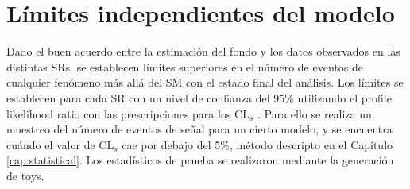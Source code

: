 \begin{table}[ht!]
\begin{tabular}{lccc}
      \hline
      \hline
    \end{tabular}
\label{tab:syst_rel_impact}
\end{table}




\section{Límites independientes del modelo}


Dado el buen acuerdo entre la estimación del fondo y los datos observados en las distintas SRs, se establecen límites superiores en el número de eventos de cualquier fenómeno más allá del SM con el estado final del análisis. Los límites se establecen para cada SR con un nivel de confianza del 95\% utilizando el profile likelihood ratio con las prescripciones para los $\text{CL}_{s}$ \cite{Read:2002hq}. Para ello se realiza un muestreo del número de eventos de señal para un cierto modelo, y se encuentra cuándo el valor de $\text{CL}_{s}$ cae por debajo del 5\%, método descripto en el Capítulo \ref{cap:statistical}. Los estadísticos de prueba se realizaron mediante la generación de  toys.


